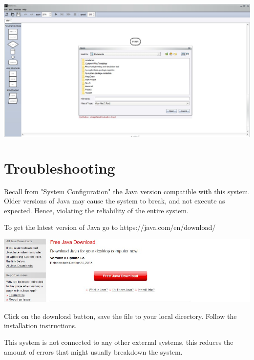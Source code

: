\documentclass[11pt,a4paper,titlepage]{article}
\begin{document}
	\includegraphics[width=14cm]{images/openFlowchart.jpg}
	
\section{Troubleshooting}

Recall from "System Configuration" the Java version compatible with this system. Older versions of Java may cause the system to break, and not execute as expected. Hence, violating the reliability of the entire system. \newline

To get the latest version of Java go to https://java.com/en/download/ \newline \newline

\includegraphics[width=14cm]{images/installJava.jpg} \newline

Click on the download button, save the file to your local directory. Follow the installation instructions.

This system is not connected to any other external systems, this reduces the amount of errors that might usually breakdown the system.
\end{document}
